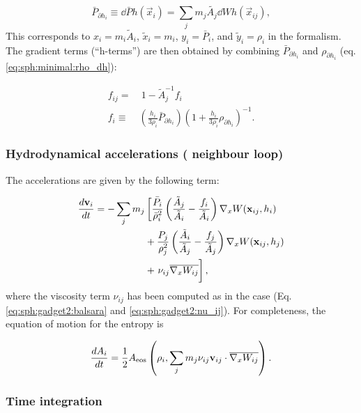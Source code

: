 \begin{equation}
\bar P_{\partial h_i} \equiv \dd{\bar{P}}{h}(\vec{x}_i) = \sum_j m_j
\tilde{A_j} \dd{W}{h}(\vec{x}_{ij}), \label{eq:sph:pe:P_dh}
\end{equation}
This corresponds to $x_i = m_i \tilde{A}_i$, $\tilde{x}_i = m_i$, $y_i =
\bar{P}_i$, and $\tilde{y}_i = \rho_i$ in the \citet{hopkins2013} formalism.
The gradient terms (``h-terms'') are then obtained by combining $\bar
P_{\partial h_i}$ and $\rho_{\partial h_i}$ (eq. \ref{eq:sph:minimal:rho_dh}):

\begin{align}
    f_{ij} = & ~ 1 - \tilde{A}_j^{-1} f_i \nonumber \\
    f_i \equiv &  \left(\frac{h_i}{3\rho_i}\bar P_{\partial
    h_i}\right)\left(1 + \frac{h_i}{3\rho_i}\rho_{\partial
    h_i}\right)^{-1}. 
\end{align}

\subsubsection{Hydrodynamical accelerations ( neighbour loop)}

The accelerations are given by the following term:

\begin{align}
  \frac{d{\mathbf{v}}_i}{dt} = -\sum_j m_j &\left[\frac{\bar P_i}{\bar\rho_i^2} \left(\frac{\tilde A_j}{\tilde A_i} - \frac{f_i}{\tilde A_i}\right)\nabla_x W({\mathbf{x}}_{ij}, h_i) \right.  \nonumber \\
  &+\frac{P_j}{\rho_j^2} \left(\frac{\tilde A_i}{\tilde A_j} - \frac{f_j}{\tilde A_j}\right)\nabla_x W({\mathbf{x}}_{ij},h_j) \\
  &+ \left. \bigg.\nu_{ij} \overline{\nabla_xW_{ij}} \right], \label{eq:sph:pe:dv_dt}
\end{align}
where the viscosity term $\nu_{ij}$ has been computed as in
the \GadgetSPH case (Eq. \ref{eq:sph:gadget2:balsara}
and \ref{eq:sph:gadget2:nu_ij}). For completeness, the equation of
motion for the entropy is

\begin{equation}
\frac{dA_i}{dt} = \frac{1}{2} A_{\rm eos}\left(\rho_i, \sum_j
m_j \nu_{ij}{\mathbf{v}}_{ij}\cdot \overline{\nabla_xW_{ij}}\right).
\end{equation}

\subsubsection{Time integration}

